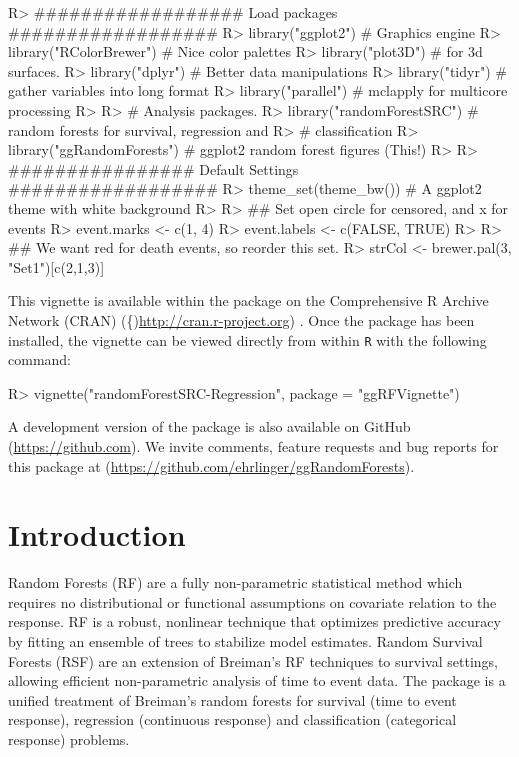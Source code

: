 \documentclass[article]{jss}
\begin{document}
\begin{CodeChunk}

\begin{CodeInput}
R> ################## Load packages ##################
R> library("ggplot2")         # Graphics engine
R> library("RColorBrewer")    # Nice color palettes
R> library("plot3D")          # for 3d surfaces. 
R> library("dplyr")           # Better data manipulations
R> library("tidyr")           # gather variables into long format
R> library("parallel")        # mclapply for multicore processing
R> 
R> # Analysis packages.
R> library("randomForestSRC") # random forests for survival, regression and 
R>                            # classification
R> library("ggRandomForests") # ggplot2 random forest figures (This!)
R> 
R> ################ Default Settings ##################
R> theme_set(theme_bw())     # A ggplot2 theme with white background
R> 
R> ## Set open circle for censored, and x for events 
R> event.marks <- c(1, 4)
R> event.labels <- c(FALSE, TRUE)
R> 
R> ## We want red for death events, so reorder this set.
R> strCol <- brewer.pal(3, "Set1")[c(2,1,3)]
\end{CodeInput}
\end{CodeChunk}

This vignette is available within the  package on
the Comprehensive R Archive Network (CRAN)
(\{)\url{http://cran.r-project.org}) \citep{rcore}. Once the package has
been installed, the vignette can be viewed directly from within
\texttt{R} with the following command:

\begin{CodeChunk}

\begin{CodeInput}
R> vignette("randomForestSRC-Regression", package = "ggRFVignette")
\end{CodeInput}
\end{CodeChunk}

A development version of the  package is also
available on GitHub (\url{https://github.com}). We invite comments,
feature requests and bug reports for this package at
(\url{https://github.com/ehrlinger/ggRandomForests}).

\section{Introduction}\label{introduction}

Random Forests \citep{Breiman:2001} (RF) are a fully non-parametric
statistical method which requires no distributional or functional
assumptions on covariate relation to the response. RF is a robust,
nonlinear technique that optimizes predictive accuracy by fitting an
ensemble of trees to stabilize model estimates. Random Survival Forests
(RSF) \citep[\citet{Ishwaran:2008}]{Ishwaran:2007a} are an extension of
Breiman's RF techniques to survival settings, allowing efficient
non-parametric analysis of time to event data. The 
package \citep{Ishwaran:RFSRC:2014} is a unified treatment of Breiman's
random forests for survival (time to event response), regression
(continuous response) and classification (categorical response)
problems.
\end{document}
